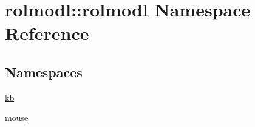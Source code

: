 \hypertarget{namespacerolmodl_1_1rolmodl}{}\section{rolmodl\+::rolmodl Namespace Reference}
\label{namespacerolmodl_1_1rolmodl}
\subsection*{Namespaces}
\begin{DoxyCompactItemize}
\item 
 \mbox{\hyperlink{namespacerolmodl_1_1rolmodl_1_1kb}{kb}}
\item 
 \mbox{\hyperlink{namespacerolmodl_1_1rolmodl_1_1mouse}{mouse}}
\end{DoxyCompactItemize}

